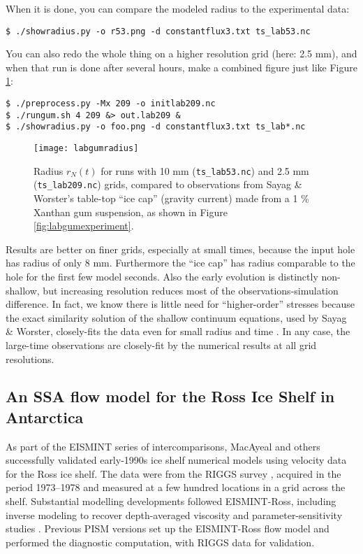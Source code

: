 When it is done, you can compare the modeled radius to the experimental data:
\begin{verbatim}
$ ./showradius.py -o r53.png -d constantflux3.txt ts_lab53.nc
\end{verbatim}%
You can also redo the whole thing on a higher resolution grid (here: 2.5 mm), and when that run is done after several hours, make a combined figure just like Figure \ref{fig:labgumresult}:
\begin{verbatim}
$ ./preprocess.py -Mx 209 -o initlab209.nc
$ ./rungum.sh 4 209 &> out.lab209 &
$ ./showradius.py -o foo.png -d constantflux3.txt ts_lab*.nc
\end{verbatim}%

\begin{figure}[ht]
\centering
\texttt{[image: labgumradius]}
\caption{Radius $r_N(t)$ for runs with 10 mm (\texttt{ts_lab53.nc}) and 2.5 mm (\texttt{ts_lab209.nc}) grids, compared to observations from Sayag \& Worster's \cite{SayagWorster2013} table-top ``ice cap'' (gravity current) made from a 1 \% Xanthan gum suspension, as shown in Figure \ref{fig:labgumexperiment}.}
\label{fig:labgumresult}
\end{figure}

Results are better on finer grids, especially at small times, because the input hole has radius of only 8 mm.  Furthermore the ``ice cap'' has radius comparable to the hole for the first few model seconds.  Also the early evolution is distinctly non-shallow, but increasing resolution reduces most of the observations-simulation difference.  In fact, we know there is little need for ``higher-order'' stresses because the exact similarity solution of the shallow continuum equations, used by Sayag \& Worster, closely-fits the data even for small radius and time \cite[Figure 4]{SayagWorster2013}.  In any case, the large-time observations are closely-fit by the numerical results at all grid resolutions.


\subsection{An SSA flow model for the Ross Ice Shelf in Antarctica}\label{sec:ross}   

As part of the EISMINT series of intercomparisons, MacAyeal and others \cite{MacAyealetal} successfully validated early-1990s ice shelf numerical models using velocity data for the Ross ice shelf.  The data were from the RIGGS survey \cite{RIGGS2}, acquired in the period 1973--1978 and measured at a few hundred locations in a grid across the shelf.  Substantial modelling developments followed EISMINT-Ross, including inverse modeling to recover depth-averaged viscosity \cite{RommelaereMacAyeal} and parameter-sensitivity studies \cite{HumbertGreveHutter}.  Previous PISM versions set up the EISMINT-Ross flow model and performed the diagnostic computation, with RIGGS data for validation.

